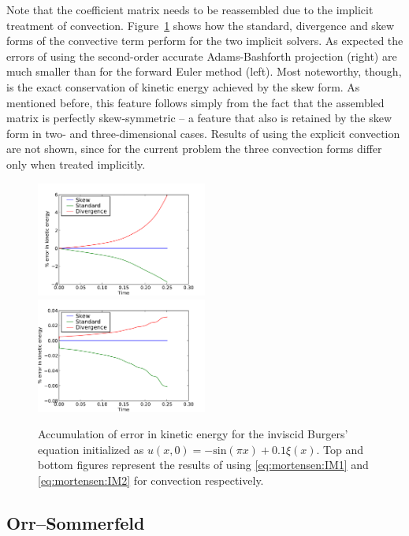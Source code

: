 Note that the coefficient matrix  needs
to be reassembled due to the implicit treatment of
convection. Figure~\ref{fig:mortensen:burgers_KE} shows how the standard,
divergence and skew forms of the convective term perform for the two
implicit solvers. As expected the errors of using the second-order
accurate Adams-Bashforth projection (right) are much smaller than for
the forward Euler method (left). Most noteworthy, though, is the exact
conservation of kinetic energy achieved by the skew form.
As mentioned before, this feature follows simply from the fact that
the assembled matrix  is perfectly skew-symmetric -- a feature
that also is retained by the skew form in two- and three-dimensional
cases. Results of using the explicit convection are not shown, since
for the current problem the three convection forms differ only when
treated implicitly.

\begin{figure}
 \includegraphics[width=0.5\textwidth]{chapters/mortensen/pdf/Burgers_KE_IM1.pdf}
 \includegraphics[width=0.5\textwidth]{chapters/mortensen/pdf/Burgers_KE_IM2.pdf}
 \caption{ Accumulation of error in kinetic energy for the inviscid
   Burgers' equation initialized as $u(x,0)=-\text{sin}(\pi x)+0.1
   \xi(x)$. Top and bottom figures represent the results of using
   \eqref{eq:mortensen:IM1} and \eqref{eq:mortensen:IM2} for
   convection respectively. }
\label{fig:mortensen:burgers_KE}
\end{figure}

\subsection{Orr--Sommerfeld}
\label{sec:mortensen:OS}

